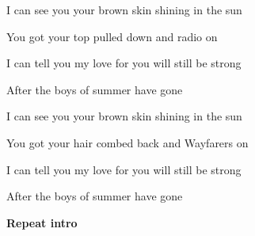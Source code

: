  I can see you  your brown skin shining in the sun

You got your top pulled down and  radio on

 I can tell you my  love for you will still be strong

After the boys of  summer have gone

 I can see you  your brown skin shining in the sun

You got your hair combed back and  Wayfarers on

 I can tell you my  love for you will still be strong

After the boys of  summer have gone

\textbf{Repeat intro} 


